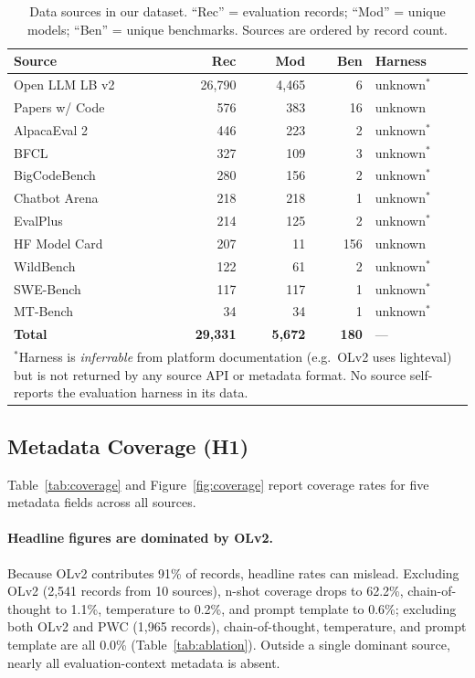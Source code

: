 \documentclass[11pt]{article}
\begin{document}
\begin{table}[t]
\centering
\small
\setlength{\tabcolsep}{3pt}
\caption{Data sources in our dataset. ``Rec'' = evaluation
records; ``Mod'' = unique models; ``Ben'' = unique benchmarks.
Sources are ordered by record count.}
\label{tab:sources}
\begin{tabular}{lrrrl}
\toprule
\textbf{Source} & \textbf{Rec} & \textbf{Mod} & \textbf{Ben}
  & \textbf{Harness} \\
\midrule
Open LLM LB v2   & 26,790 & 4,465 &   6 & unknown$^\ast$ \\
Papers w/ Code    &    576 &   383 &  16 & unknown \\
AlpacaEval 2      &    446 &   223 &   2 & unknown$^\ast$ \\
BFCL              &    327 &   109 &   3 & unknown$^\ast$ \\
BigCodeBench      &    280 &   156 &   2 & unknown$^\ast$ \\
Chatbot Arena     &    218 &   218 &   1 & unknown$^\ast$ \\
EvalPlus          &    214 &   125 &   2 & unknown$^\ast$ \\
HF Model Card     &    207 &    11 & 156 & unknown \\
WildBench         &    122 &    61 &   2 & unknown$^\ast$ \\
SWE-Bench         &    117 &   117 &   1 & unknown$^\ast$ \\
MT-Bench          &     34 &    34 &   1 & unknown$^\ast$ \\
\midrule
\textbf{Total} & \textbf{29,331} & \textbf{5,672} &
  \textbf{180} & --- \\
\bottomrule
\multicolumn{5}{p{0.95\columnwidth}}{\footnotesize $^\ast$Harness
  is \emph{inferrable} from platform documentation (e.g.\ OLv2 uses
  lighteval) but is not returned by any source API or metadata format.
  No source self-reports the evaluation harness in its data.}
\end{tabular}
\end{table}

\subsection{Metadata Coverage (H1)}\label{sec:coverage}

Table~\ref{tab:coverage} and Figure~\ref{fig:coverage} report
coverage rates for five metadata fields across all sources.

\paragraph{Headline figures are dominated by OLv2.}
Because OLv2 contributes 91\% of records, headline rates can
mislead. Excluding OLv2 (2{,}541 records from 10 sources),
n-shot coverage drops to 62.2\%, chain-of-thought to 1.1\%,
temperature to 0.2\%, and prompt template to 0.6\%; excluding
both OLv2 and PWC (1{,}965 records), chain-of-thought,
temperature, and prompt template are all 0.0\%
(Table~\ref{tab:ablation}). Outside a single dominant source,
nearly all evaluation-context metadata is absent.
\end{document}
